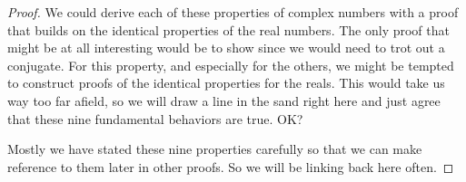 %
\begin{proof}
We could derive each of these properties of complex numbers with a proof that builds on the identical properties of the real numbers.  The only proof that might be at all interesting would be to show  since we would need to trot out a conjugate.  For this property, and especially for the others, we might be tempted to construct proofs of the identical properties for the reals.  This would take us way too far afield, so we will draw a line in the sand right here and just agree that these nine fundamental behaviors are true.  OK?\par
%
Mostly we have stated these nine properties carefully so that we can make reference to them later in other proofs.  So we will be linking back here often.
%
\end{proof}







